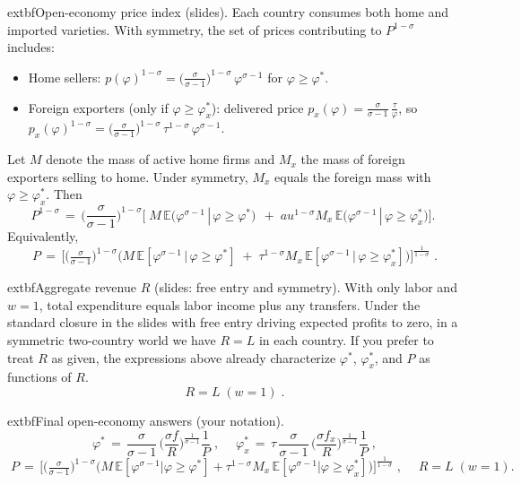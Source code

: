 \begin{solution}
\bigskip
	extbf{Open-economy price index (slides).}
Each country consumes both home and imported varieties. With symmetry, the set of prices contributing to $P^{1-\sigma}$ includes:
\begin{itemize}
	\item Home sellers: $p(\varphi)^{1-\sigma}=\big(\tfrac{\sigma}{\sigma-1}\big)^{1-\sigma}\,\varphi^{\sigma-1}$ for $\varphi\ge \varphi^*$.
	\item Foreign exporters (only if $\varphi\ge \varphi_x^*$): delivered price $p_x(\varphi)=\tfrac{\sigma}{\sigma-1}\,\tfrac{\tau}{\varphi}$, so $p_x(\varphi)^{1-\sigma}=\big(\tfrac{\sigma}{\sigma-1}\big)^{1-\sigma}\,\tau^{1-\sigma}\,\varphi^{\sigma-1}$.
\end{itemize}
Let $M$ denote the mass of active home firms and $M_x$ the mass of foreign exporters selling to home. Under symmetry, $M_x$ equals the foreign mass with $\varphi\ge \varphi_x^*$. Then
\[
P^{1-\sigma} \,=\, \Big(\frac{\sigma}{\sigma-1}\Big)^{1-\sigma} \bigg[\; M\, \mathbb{E}\big(\varphi^{\sigma-1}\,|\,\varphi\ge \varphi^*\big) \,\; +\; 
	au^{1-\sigma} M_x\, \mathbb{E}\big(\varphi^{\sigma-1}\,|\,\varphi\ge \varphi_x^*\big) \bigg].
\]
Equivalently,
\[
\boxed{\;\displaystyle P \,=\, \Bigg[ \Big(\tfrac{\sigma}{\sigma-1}\Big)^{1-\sigma}\Big( M\, \mathbb{E}[\varphi^{\sigma-1}\,|\,\varphi\ge \varphi^*] 
\; +\; \tau^{1-\sigma} M_x\, \mathbb{E}[\varphi^{\sigma-1}\,|\,\varphi\ge \varphi_x^*]\Big) \Bigg]^{\!\tfrac{1}{1-\sigma}}\; }.
\]

\bigskip
	extbf{Aggregate revenue $R$ (slides: free entry and symmetry).}
With only labor and $w=1$, total expenditure equals labor income plus any transfers. Under the standard closure in the slides with free entry driving expected profits to zero, in a symmetric two-country world we have $R=L$ in each country. If you prefer to treat $R$ as given, the expressions above already characterize $\varphi^*$, $\varphi_x^*$, and $P$ as functions of $R$.
\[
\boxed{\; R = L \; (w=1)\; }.
\]

\bigskip
	extbf{Final open-economy answers (your notation).}
\[
\boxed{\;\displaystyle \varphi^* \,=\, \frac{\sigma}{\sigma-1}\,\Big(\frac{\sigma f}{R}\Big)^{\!\tfrac{1}{\sigma-1}} \frac{1}{P}\; },\quad
\boxed{\;\displaystyle \varphi_x^* \,=\, \tau\, \frac{\sigma}{\sigma-1}\,\Big(\frac{\sigma f_x}{R}\Big)^{\!\tfrac{1}{\sigma-1}} \frac{1}{P}\; },
\]
\[
\boxed{\;\displaystyle P \,=\, \Bigg[ \Big(\tfrac{\sigma}{\sigma-1}\Big)^{1-\sigma}\Big( M\, \mathbb{E}[\varphi^{\sigma-1}|\varphi\ge \varphi^*] + \tau^{1-\sigma} M_x\, \mathbb{E}[\varphi^{\sigma-1}|\varphi\ge \varphi_x^*] \Big) \Bigg]^{\!\tfrac{1}{1-\sigma}}\; },\quad
\boxed{\; R = L\; (w=1) }.
\]
\end{solution}
 